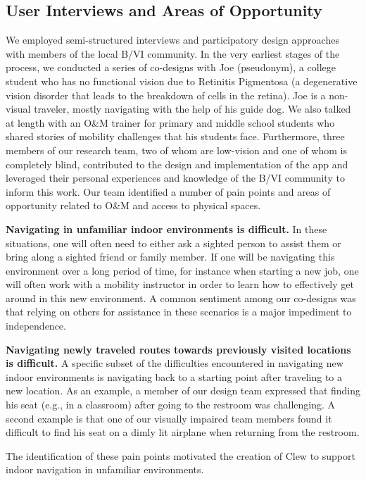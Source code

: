 \documentclass[chi]{sigchi}
\newcommand{\BVI}{B/VI\xspace}
\newcommand{\OM}{O\&M\xspace}
\begin{document}
\subsection{User Interviews and Areas of Opportunity}\label{sec:areasofopportunity}
We employed semi-structured interviews and participatory design approaches \cite{buhler2001empowered, schuler1993participatory} with members of the local \BVI community.  In the very earliest stages of the process, we conducted a series of co-designs with Joe (pseudonym), a college student who has no functional vision due to Retinitis Pigmentosa (a degenerative vision disorder that leads to the breakdown of cells in the retina).  Joe is a non-visual traveler, mostly navigating with the help of his guide dog. We also talked at length with an \OM trainer for primary and middle school students who shared stories of mobility challenges that his students face. Furthermore, three members of our research team, two of whom are low-vision and one of whom is completely blind, contributed to the design and implementation of the app and leveraged their personal experiences and knowledge of the \BVI community to inform this work.  Our team identified a number of pain points and areas of opportunity related to \OM and access to physical spaces.

\textbf{Navigating in unfamiliar indoor environments is difficult.} In these situations, one will often need to either ask a sighted person to assist them or bring along a sighted friend or family member.  If one will be navigating this environment over a long period of time, for instance when starting a new job, one will often work with a mobility instructor in order to learn how to effectively get around in this new environment.  A common sentiment among our co-designs was that relying on others for assistance in these scenarios is a major impediment to independence.

\textbf{Navigating newly traveled routes towards previously visited locations is difficult.} A specific subset of the difficulties encountered in navigating new indoor environments is navigating back to a starting point after traveling to a new location.  As an example, a member of our design team expressed that finding his seat (e.g., in a classroom) after going to the restroom was challenging.  A second example is that one of our visually impaired team members found it difficult to find his seat on a dimly lit airplane when returning from the restroom.

The identification of these pain points motivated the creation of Clew to support indoor navigation in unfamiliar environments.%
\end{document}
